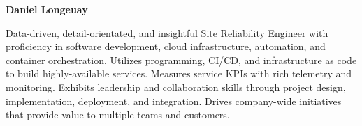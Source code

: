 \documentclass[11pt, oneside]{memoir}
\begin{document}
\begin{minipage}[b][8em][c]{33em}
    {\hspace{2em}\fontsize{34pt}{40pt}\selectfont
        \rmfamily\textbf{Daniel Longeuay}}

    \textsf{Data-driven, detail-orientated, and insightful Site Reliability Engineer with proficiency in software
      development, cloud infrastructure, automation, and container orchestration. Utilizes programming, CI/CD,
      and infrastructure as code to build highly-available services. Measures service KPIs with rich telemetry
      and monitoring. Exhibits leadership and collaboration skills through project design, implementation, 
      deployment, and integration. Drives company-wide initiatives that provide value to multiple teams and customers.}
\end{minipage}
\end{document}
